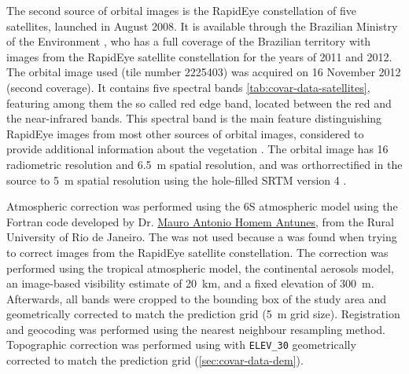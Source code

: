 The second source of orbital images is the RapidEye constellation of five satellites, launched in August \num{2008}.
It is available through the Brazilian Ministry of the Environment \cite{Brasil2012}, who has a full coverage of the 
Brazilian territory with images from the RapidEye satellite constellation for the years of \num{2011} and \num{2012}. 
The orbital image used (tile number \num{2225403}) was acquired on \num{16} November \num{2012} (second coverage). It 
contains five spectral bands \ref{tab:covar-data-satellites}, featuring among them the so called red edge band, 
located between the red and the near-infrared bands. This spectral band is the main feature distinguishing RapidEye 
images from most other sources of orbital images, considered to provide additional information about the vegetation 
\cite{WeicheltEtAl2013}. The orbital image has \SI{16}{\bit} radiometric resolution and \SI{6.5}{\m} spatial 
resolution, and was orthorrectified in the source to \SI{5}{\m} spatial resolution using the hole-filled SRTM 
version \num{4} \cite{RapidEye2013}.

Atmospheric correction was performed using the 6S atmospheric model \cite{VermoteEtAl1997} using the Fortran code 
developed by Dr. \href{http://lattes.cnpq.br/3818721407909667}{Mauro Antonio Homem Antunes}, from the Rural University 
of Rio de Janeiro. The  was not used because a \atcorrbug{} was found when trying to correct images 
from the RapidEye satellite constellation. The correction was performed using the tropical atmospheric model, the 
continental aerosols model, an image-based visibility estimate of \SI{20}{\km}, and a fixed elevation of 
\SI{300}{\m}. Afterwards, all bands were cropped to the bounding box of the study area and geometrically corrected 
to match the prediction grid (\SI{5}{\m} grid size). Registration and geocoding was performed using the nearest 
neighbour resampling method. Topographic correction was performed using  with \texttt{ELEV\_30} 
geometrically corrected to match the prediction grid (\autoref{sec:covar-data-dem}).

